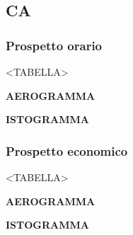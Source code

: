 \subsection{CA}

\subsubsection{Prospetto orario}

<TABELLA>


\textbf{AEROGRAMMA}


\textbf{ISTOGRAMMA}

\subsubsection{Prospetto economico}

<TABELLA>


\textbf{AEROGRAMMA}


\textbf{ISTOGRAMMA}

